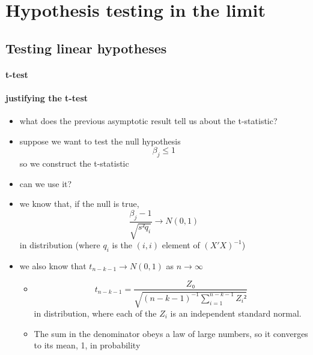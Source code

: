 \section{Hypothesis testing in the limit}

\subsection{Testing linear hypotheses}

\paragraph{t-test}

\paragraph{justifying the t-test}
\begin{itemize}
\item what does the previous asymptotic result tell us about the
  t-statistic?
\item suppose we want to test the null hypothesis
  \[ β_j ≤ 1 \] so we construct the t-statistic
\item can we use it?
\item we know that, if the null is true,
  \[ \frac{β_j - 1}{\sqrt{s² q_i}} → N(0,1) \] in distribution
  (where $q_i$ is the $(i,i)$ element of $(X'X)^{-1}$)
\item we also know that $t_{n-k-1} → N(0,1)$ as $n → ∞$
\begin{itemize}
\item
  \[t_{n-k-1} = \frac{Z₀}{\sqrt{(n-k-1)^{-1} ∑_{i=1}^{n-k-1} Z_i²}}\]
  in distribution, where each of the $Z_i$ is an independent
  standard normal.
\item The sum in the denominator obeys a law of large numbers, so it
  converges to its mean, 1, in probability
\end{itemize}
\end{itemize}

